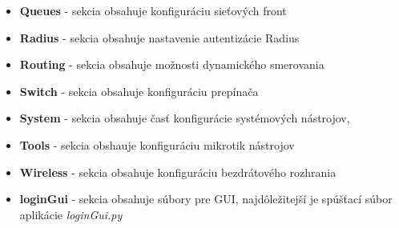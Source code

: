 \begin{itemize}
\item \textbf{Queues} - sekcia obsahuje konfiguráciu sieťových front
\item \textbf{Radius} - sekcia obsahuje nastavenie autentizácie Radius 
\item \textbf{Routing} - sekcia obsahuje možnosti dynamického smerovania 
\item \textbf{Switch} - sekcia obsahuje konfiguráciu prepínača
\item \textbf{System} - sekcia obsahuje časť konfigurácie systémových nástrojov,
\item \textbf{Tools} - sekcia obshauje konfiguráciu mikrotik nástrojov
\item \textbf{Wireless} - sekcia obsahuje konfiguráciu bezdrátového rozhrania
\item \textbf{loginGui} - sekcia obsahuje súbory pre GUI, najdôležitejší je spúšťací súbor aplikácie \textit{loginGui.py}
\end{itemize}
